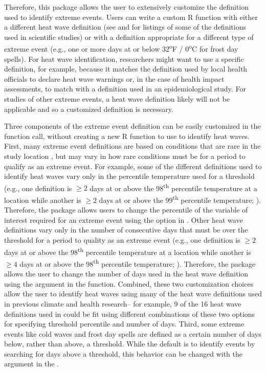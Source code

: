 Therefore, this package allows the user to extensively customize the
definition used to identify extreme events. Users can write a custom R
function with either a different heat wave definition (see
\citet{smith2013heat} and \citet{kent2014heat} for listings of some of
the definitions used in scientific studies) or with a definition
appropriate for a different type of extreme event (e.g., one or more
days at or below 32\textsuperscript{o}F / 0\textsuperscript{o}C for
frost day spells). For heat wave identification, researchers might want
to use a specific definition, for example, because it matches the
definition used by local health officials to declare heat wave warnings
or, in the case of health impact assessments, to match with a definition
used in an epidemiological study. For studies of other extreme events, a
heat wave definition likely will not be applicable and so a customized
definition is necessary.

Three components of the extreme event definition can be easily
customized in the  function call, without creating a
new R function to use to identify heat waves. First, many extreme event
definitions are based on conditions that are rare in the study location
\citep{IPCCch1}, but may vary in how rare conditions must be for a
period to qualify as an extreme event. For example, some of the
different definitions used to identify heat waves vary only in the
percentile temperature used for a threshold (e.g., one definition is
\(\ge2\) days at or above the 98\textsuperscript{th} percentile
temperature at a location while another is \(\ge2\) days at or above the
99\textsuperscript{th} percentile temperature;
\citet{kent2014heat, smith2013heat}). Therefore, the
 package allows users to change the percentile of
the variable of interest required for an extreme event using the
 option in . Other heat wave
definitions vary only in the number of consecutive days that must be
over the threshold for a period to quality as an extreme event (e.g.,
one definition is \(\ge2\) days at or above the 98\textsuperscript{th}
percentile temperature at a location while another is \(\ge4\) days at
or above the 98\textsuperscript{th} percentile temperature;
\citet{anderson2009weather}). Therefore, the package allows the user to
change the number of days used in the heat wave definition using the
 argument in the  function. Combined,
these two customization choices allow the user to identify heat waves
using many of the heat wave definitions used in previous climate and
health research-- for example, 9 of the 16 heat wave definitions used in
\citet{kent2014heat} could be fit using different combinations of these
two options for specifying threshold percentile and number of days.
Third, some extreme events like cold waves and frost day spells are
defined as a certain number of days below, rather than above, a
threshold. While the default is to identify events by searching for days
above a threshold, this behavior can be changed with the
 argument in the
.

